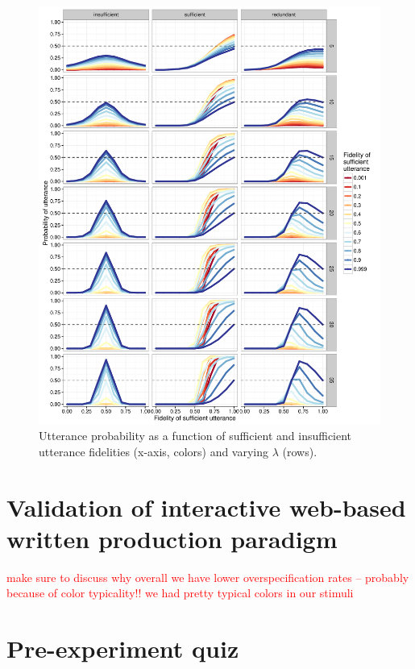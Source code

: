 \documentclass[11pt]{article}
\newcommand{\red}[1]{\textcolor{Red}{#1}}
\begin{document}
\begin{figure}
\includegraphics[width=\textwidth]{pics/modelexploration-fullfidelityeffect-unlogged-wide}
\caption{Utterance probability as a function of sufficient and insufficient utterance fidelities (x-axis, colors) and varying $\lambda$ (rows).}
\label{fig:fullexploration}
\end{figure}

\section{Validation of interactive web-based written production paradigm}
\label{app:replication}

\red{make sure to discuss why overall we have lower overspecification rates -- probably because of color typicality!! we had pretty typical colors in our stimuli}

\section{Pre-experiment quiz}
\label{app:numdistractors}
\end{document}
